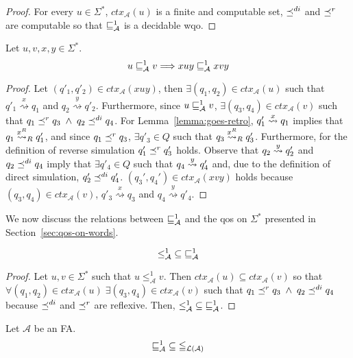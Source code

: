 \begin{proof}
For every $u \in \Sigma^*$, $ctx_{\mathcal{A}}(u)$ is a finite and computable set,
$\preceq^{di}$ and $\preceq^r$ are computable
so that $\sqsubseteq^1_{\mathcal{A}}$ is a decidable wqo.
\end{proof}

\begin{proposition}[Monotonicity]
\label{prop:wsdir-monotonicity}
Let $u,v,x,y \in \Sigma^*$.
\[ u \sqsubseteq^1_{\mathcal{A}} v \Longrightarrow xuy \sqsubseteq^1_{\mathcal{A}} xvy \]
\end{proposition}

\begin{proof}
Let $(q'_1, q'_2) \in ctx_{\mathcal{A}}(xuy)$, then $\exists(q_1, q_2) \in ctx_{\mathcal{A}}(u)$ such that
$q'_1 \overset{x}{\rightsquigarrow} q_1$ and
$q_2 \overset{y}{\rightsquigarrow} q'_2$.
Furthermore, since $u \sqsubseteq^1_{\mathcal{A}} v$, $\exists(q_3, q_4) \in ctx_{\mathcal{A}}(v)$
such that $q_1 \preceq^r q_3 \;\wedge\; q_2 \preceq^{di} q_4$.
For Lemma~\ref{lemma:goes-retro}, $q'_1 \overset{x}{\rightsquigarrow} q_1$ implies that $q_1 \overset{x^R}{\rightsquigarrow}_R q'_1$,
and since $q_1 \preceq^r q_3$, $\exists q'_3 \in Q$ such that $ q_3 \overset{x^R}{\rightsquigarrow}_R q'_3$.
Furthermore, for the definition of reverse simulation $q'_1 \preceq^r q'_3$ holds.
Observe that $q_2 \overset{y}{\rightsquigarrow} q'_2$ and $q_2 \preceq^{di} q_4$ imply that $\exists q'_4 \in Q$
such that $q_4 \overset{y}{\rightsquigarrow} q'_4$ and, due to the definition of direct simulation,
$q'_2 \preceq^{di} q'_4$.
$(q_3',q_4') \in ctx_{\mathcal{A}}(xvy)$ holds because
$(q_3, q_4) \in ctx_{\mathcal{A}}(v)$, $q'_3 \overset{x}{\rightsquigarrow} q_3$
and $q_4 \overset{y}{\rightsquigarrow} q'_4$.
\end{proof}

We now discuss the relations between $\sqsubseteq^1_{\mathcal{A}}$ and the qos on $\Sigma^*$
presented in Section~\ref{sec:qos-on-words}.

\begin{proposition}
\[ \leq^1_{\mathcal{A}} \; \subseteq \; \sqsubseteq^1_{\mathcal{A}} \]
\end{proposition}

\begin{proof}
Let $u , v \in \Sigma^*$ such that  $u \leq^1_{\mathcal{A}} v$.
Then $ctx_{\mathcal{A}}(u) \subseteq ctx_{\mathcal{A}}(v)$ so that
$\forall(q_1, q_2) \in ctx_{\mathcal{A}}(u) \;
\exists (q_3,q_4) \in ctx_{\mathcal{A}}(v)$ such that $q_1 \preceq^r q_3 \;\wedge\; q_2 \preceq^{di} q_4$
because $\preceq^{di}$ and  $\preceq^r$ are reflexive.
Then, $\leq^1_{\mathcal{A}} \; \subseteq \; \sqsubseteq^1_{\mathcal{A}}$.
\end{proof}

\begin{proposition}
Let $\mathcal{A}$ be an FA.
\[  \sqsubseteq^1_{\mathcal{A}} \; \subseteq \; \leqq_{\mathcal{L}(\mathcal{A})} \]
\end{proposition}

